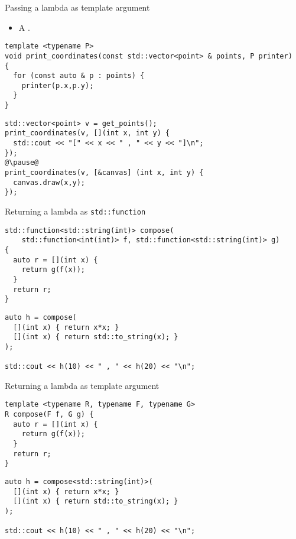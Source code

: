 \begin{frame}[t,fragile]{Passing a lambda as template argument}
\begin{itemize}
  \item A .
\end{itemize}
\begin{lstlisting}
template <typename P>
void print_coordinates(const std::vector<point> & points, P printer) 
{
  for (const auto & p : points) {
    printer(p.x,p.y);
  }
}
\end{lstlisting}

\begin{lstlisting}[escapechar=@]
std::vector<point> v = get_points();
print_coordinates(v, [](int x, int y) {
  std::cout << "[" << x << " , " << y << "]\n";
});
@\pause@
print_coordinates(v, [&canvas] (int x, int y) {
  canvas.draw(x,y);
});
\end{lstlisting}
\end{frame}

\begin{frame}[t,fragile]{Returning a lambda as \texttt{std::function}}
\begin{lstlisting}
std::function<std::string(int)> compose(
    std::function<int(int)> f, std::function<std::string(int)> g) 
{
  auto r = [](int x) {
    return g(f(x));
  }
  return r;
}
\end{lstlisting}

\begin{lstlisting}
auto h = compose(
  [](int x) { return x*x; }
  [](int x) { return std::to_string(x); }
);

std::cout << h(10) << " , " << h(20) << "\n";
\end{lstlisting}
\end{frame}

\begin{frame}[t,fragile]{Returning a lambda as template argument}
\begin{lstlisting}
template <typename R, typename F, typename G>
R compose(F f, G g) {
  auto r = [](int x) {
    return g(f(x));
  }
  return r;
}
\end{lstlisting}

\begin{lstlisting}
auto h = compose<std::string(int)>(
  [](int x) { return x*x; }
  [](int x) { return std::to_string(x); }
);

std::cout << h(10) << " , " << h(20) << "\n";
\end{lstlisting}
\end{frame}

